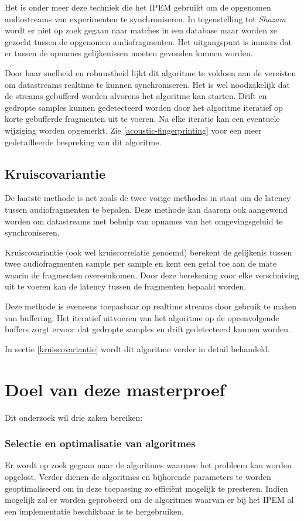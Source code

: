 Het is onder meer deze techniek die het IPEM gebruikt om de opgenomen audiostreams van experimenten te synchroniseren. In tegenstelling tot \textit{Shazam} wordt er niet op zoek gegaan naar matches in een database maar worden ze gezocht tussen de opgenomen audiofragmenten. Het uitgangspunt is immers dat er tussen de opnames gelijkenissen moeten gevonden kunnen worden.

Door haar snelheid en robuustheid lijkt dit algoritme te voldoen aan de vereisten om datastreams realtime te kunnen synchroniseren. Het is wel noodzakelijk dat de streams gebufferd worden alvorens het algoritme kan starten. Drift en gedropte samples kunnen gedetecteerd worden door het algoritme iteratief op korte gebufferde fragmenten uit te voeren. Na elke iteratie kan een eventuele wijziging worden opgemerkt. Zie \ref{acoustic-fingerprinting} voor een meer gedetailleerde bespreking van dit algoritme.

\subsection{Kruiscovariantie}

De laatste methode is net zoals de twee vorige methodes in staat om de latency tussen audiofragmenten te bepalen. Deze methode kan daarom ook aangewend worden om datastreams met behulp van opnames van het omgevingsgeluid te synchroniseren.

Kruiscovariantie (ook wel kruiscorrelatie genoemd) berekent de gelijkenis tussen twee audiofragmenten sample per sample en kent een getal toe aan de mate waarin de fragmenten overeenkomen. Door deze berekening voor elke verschuiving uit te voeren kan de latency tussen de fragmenten bepaald worden.

Deze methode is eveneens toepasbaar op realtime streams door gebruik te maken van buffering. Het iteratief uitvoeren van het algoritme op de opeenvolgende buffers zorgt ervoor dat gedropte samples en drift gedetecteerd kunnen worden.

In sectie \ref{kruiscovariantie} wordt dit algoritme verder in detail behandeld.

\section{Doel van deze masterproef}
\label{doel-masterproef}

Dit onderzoek wil drie zaken bereiken: 

\subsubsection{Selectie en optimalisatie van algoritmes}
Er wordt op zoek gegaan naar de algoritmes waarmee het probleem kan worden opgelost. Verder dienen de algoritmes en bijhorende parameters te worden geoptimaliseerd om in deze toepassing zo efficiënt mogelijk te presteren. Indien mogelijk zal er worden geprobeerd om de algoritmes waarvan er bij het IPEM al een implementatie beschikbaar is te hergebruiken.


